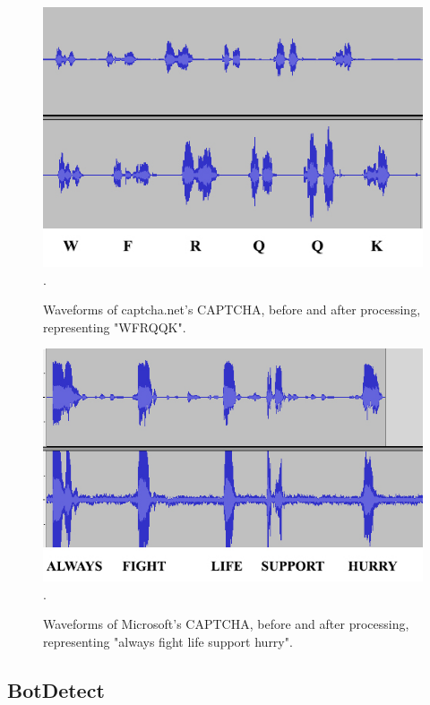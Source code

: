 \begin{figure}[t]
   \centering
   \includegraphics[width=\columnwidth]{figures/captchasnet1.jpg}.
   \caption{Waveforms of captcha.net's CAPTCHA, before and after processing, representing "WFRQQK".}
   \label{fig:captchasnet1}
\end{figure}

\begin{figure}[t]
   \centering
   \includegraphics[width=\columnwidth]{figures/Live1.jpg}.
   \caption{Waveforms of Microsoft's CAPTCHA, before and after processing, representing "always fight life support hurry".}
   \label{fig:live1}
\end{figure}


\subsection{BotDetect}
\label{sec:botdetect}

